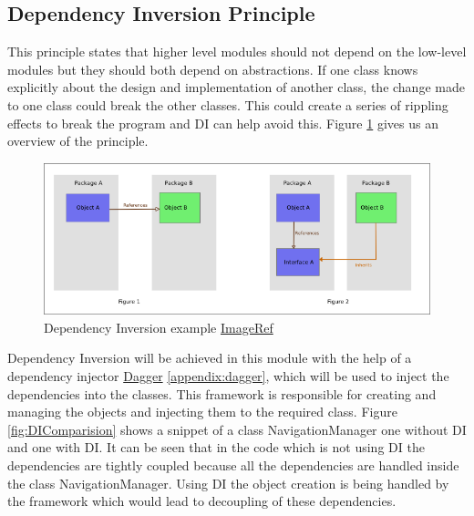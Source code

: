 \subsection{Dependency Inversion Principle}
    This principle states that higher level modules should not depend on 
    the low-level modules but they should both depend on abstractions. If one class 
    knows explicitly about the design and implementation of another class,
    the change made to one class could break the other classes. This could
    create a series of rippling effects to break the program and DI can help avoid this. Figure
    \ref{fig:DIExample} gives us an overview of the principle.

    \begin{figure}[htbp!]
        \centering \includegraphics[scale=0.85]{grafiken/di.jpg}
        \caption{Dependency Inversion example
        \href{https://upload.wikimedia.org/wikipedia/commons/9/96/Dependency_inversion.png}{ImageRef}}
        \label{fig:DIExample}
    \end{figure}

    \par
        Dependency Inversion will be achieved in this module with the help of a dependency
        injector \href{http://square.github.io/dagger/}{Dagger} 
        \ref{appendix:dagger}, 
        which 
        will be used to inject the dependencies into the classes. 
        This framework is responsible for creating and managing the 
        objects and injecting them to the required
        class. 
        Figure \ref{fig:DIComparision} shows a snippet of a class 
        NavigationManager one without DI and one with DI.
        It can be seen that in the code which is not using 
        DI the dependencies are tightly coupled because all the
        dependencies are handled inside the class NavigationManager.
        Using DI the object creation is being handled by the
        framework which would lead to decoupling of these dependencies.

    
        
